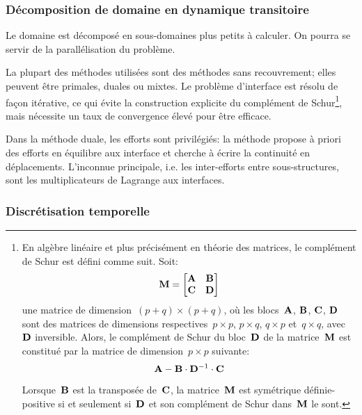 \medskip
\subsubsection{Décomposition de domaine en dynamique transitoire}\label{Sec-Schur}

Le domaine est décomposé en sous-domaines plus petits à calculer. On pourra se servir de la parallélisation du problème. 

La plupart des méthodes utilisées sont des méthodes sans recouvrement; elles peuvent être primales, duales ou mixtes. Le problème d'interface est résolu de façon itérative, ce qui évite la construction explicite du complément de Schur\footnote{En algèbre linéaire et plus précisément en théorie des matrices, le complément de Schur est défini comme suit. Soit:
\begin{equation} \MM{M}=\MM*{\MM{A} & \MM{B} \\ \MM{C} & \MM{D}} \end{equation}
une matrice de dimension~$(p+q)\times(p+q)$, où les blocs~$\MM{A}$, $\MM{B}$, $\MM{C}$, $\MM{D}$ sont des matrices de dimensions respectives~$p\times p$, $p\times q$, $q\times p$ et~$q\times q$, avec~$\MM{D}$ inversible.
Alors, le complément de Schur du bloc~$\MM{D}$ de la matrice~$\MM{M}$ est constitué par la matrice de dimension~$p\times p$ suivante:
\begin{equation} \MM{A} - \MM{B}\cdot \MMI{D}\cdot \MM{C}\end{equation}

Lorsque~$\MM{B}$ est la transposée de~$\MM{C}$, la matrice~$\MM{M}$ est symétrique définie-positive si et seulement si~$\MM{D}$ et son complément de Schur dans~$\MM{M}$ le sont.}, mais nécessite un taux de convergence élevé pour être efficace.

Dans la méthode duale, les efforts sont privilégiés: la méthode propose à priori des efforts en équilibre aux interface et cherche à écrire la continuité en déplacements. L'inconnue principale, i.e. les inter-efforts entre sous-structures, sont les multiplicateurs de Lagrange aux interfaces.

\medskip
\subsubsection{Discrétisation temporelle}

